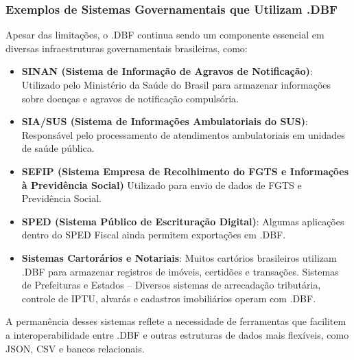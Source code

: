 \begin{titlepage}
    \subsubsection{Exemplos de Sistemas Governamentais que Utilizam .DBF}
    Apesar das limitações, o .DBF continua sendo um componente essencial em diversas infraestruturas governamentais brasileiras, como:
    \begin{itemize}
        \item \textbf{SINAN (Sistema de Informação de Agravos de Notificação)}: Utilizado pelo Ministério da Saúde do Brasil para armazenar informações sobre doenças e agravos de notificação compulsória.
        \item \textbf{SIA/SUS (Sistema de Informações Ambulatoriais do SUS)}: Responsável pelo processamento de atendimentos ambulatoriais em unidades de saúde pública.
        \item \textbf{SEFIP (Sistema Empresa de Recolhimento do FGTS e Informações à Previdência Social)} Utilizado para envio de dados de FGTS e Previdência Social.
        \item \textbf{SPED (Sistema Público de Escrituração Digital)}: Algumas aplicações dentro do SPED Fiscal ainda permitem exportações em .DBF.
        \item \textbf{Sistemas Cartorários e Notariais}: Muitos cartórios brasileiros utilizam .DBF para armazenar registros de imóveis, certidões e transações. Sistemas de Prefeituras e Estados – Diversos sistemas de arrecadação tributária, controle de IPTU, alvarás e cadastros imobiliários operam com .DBF.
    \end{itemize}
    A permanência desses sistemas reflete a necessidade de ferramentas que facilitem a interoperabilidade entre .DBF e outras estruturas de dados mais flexíveis, como JSON, CSV e bancos relacionais.

\end{titlepage}
